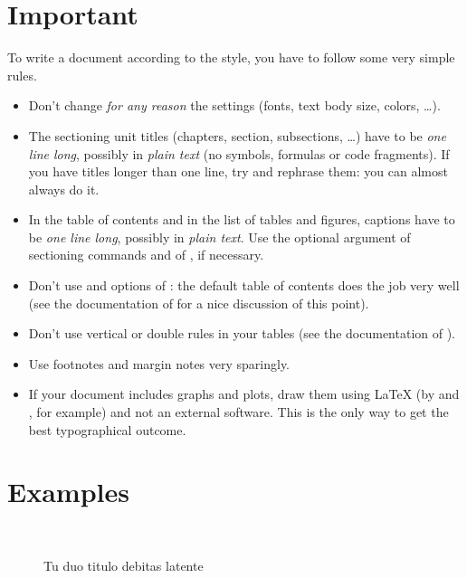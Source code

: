 \section{Important}

To write a document according to the \arsclassica{} style, you have to follow some very simple rules.
\begin{itemize}
\item Don't change \emph{for any reason} the \arsclassica{} settings (fonts, text body size, colors, \dots).
\item The sectioning unit titles (chapters, section, subsections, \dots) have to be \emph{one line long}, possibly in \emph{plain text} (no symbols, formulas or code fragments). If you have titles longer than one line, try and rephrase them: you can almost always do it.
\item In the table of contents and in the list of tables and figures, captions have to be \emph{one line long}, possibly in \emph{plain text}. Use the optional argument of sectioning commands and of , if necessary.
\item Don't use  and  options of \classicthesis: the default table of contents does the job very well (see the documentation of \classicthesis{} for a nice discussion of this point).
\item Don't use vertical or double rules in your tables (see the documentation of ).
\item Use footnotes and margin notes very sparingly.
\item If your document includes graphs and plots, draw them using \LaTeX{} (by  and , for example) and not an external software. This is the only way to get the best typographical outcome.
\end{itemize}



\section{Examples}

\begin{figure}
\centering
{} \quad
{} \\
 \quad
{}
\caption[Tu duo titulo debitas latente]{Tu duo titulo debitas latente}
\label{fig:example}
\end{figure}

